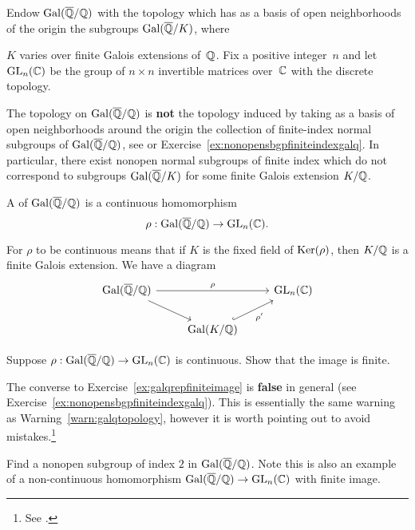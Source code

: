 Endow $\operatorname{Gal}(\overline{\mathbb{Q}}/\mathbb{Q})$ with the topology which has as a basis of open neighborhoods
of the origin the subgroups $\operatorname{Gal}(\overline{\mathbb{Q}}/K)$, where~{$K$ varies
over finite Galois extensions of~$\mathbb{Q}$.
Fix a positive integer~$n$ and let $\operatorname{GL}_n(\mathbb{C})$ be the group of
$n\times n$ invertible matrices over~$\mathbb{C}$ with the discrete topology.

\begin{warning}\label{warn:galqtopology}
	The topology on $\operatorname{Gal}(\overline{\mathbb{Q}}/\mathbb{Q})$ is {\bf not} the topology induced
	by taking as a basis of open neighborhoods around the origin
	the collection of finite-index normal subgroups of $\operatorname{Gal}(\overline{\mathbb{Q}}/\mathbb{Q})$,
	see \cite[Ch.~7]{milne:FT} or
	Exercise~\ref{ex:nonopensbgpfiniteindexgalq}. In particular,
	there exist nonopen normal subgroups of finite index which
	do not correspond to subgroups $\operatorname{Gal}(\overline{\mathbb{Q}}/K)$ for some
	finite Galois extension $K/\mathbb{Q}$.
\end{warning}

\begin{definition}
	A  of $\operatorname{Gal}(\overline{\mathbb{Q}}/\mathbb{Q})$
	is a continuous homomorphism
	$$
		\rho:\operatorname{Gal}(\overline{\mathbb{Q}}/\mathbb{Q})\to \operatorname{GL}_n(\mathbb{C}).
	$$
\end{definition}
For $\rho$ to be continuous means that if $K$ is the fixed
field of $\operatorname{Ker}(\rho)$, then $K/\mathbb{Q}$ is a finite Galois extension.  We have
a diagram
$$
	\begin{tikzcd}
		\galq \arrow{rr}{\rho} \arrow{dr} & & \GL_n(\C) \\
		& \Gal(K/\Q) \arrow[hook]{ur}[swap]{\rho'}
	\end{tikzcd}
$$

\begin{exercise}\label{ex:galqrepfiniteimage}
	Suppose $\rho:\operatorname{Gal}(\overline{\mathbb{Q}}/\mathbb{Q})\to\operatorname{GL}_n(\mathbb{C})$ is continuous.
	Show that the image is finite.
\end{exercise}

\begin{remark}
	The converse to Exercise~\ref{ex:galqrepfiniteimage}
	is \textbf{false} in general (see
	Exercise~\ref{ex:nonopensbgpfiniteindexgalq}).
	This is essentially the same warning as
	Warning~\ref{warn:galqtopology}, however it is worth
	pointing out to avoid mistakes.\footnote{
	See \cite[pg.~1]{artinconjectureLectureNotes}.}
\end{remark}

\begin{exercise}\label{ex:nonopensbgpfiniteindexgalq}
	Find a nonopen subgroup of index $2$ in $\operatorname{Gal}(\overline{\mathbb{Q}}/\mathbb{Q})$.
	Note this is also an example of a non-continuous
	homomorphism $\operatorname{Gal}(\overline{\mathbb{Q}}/\mathbb{Q})\to\operatorname{GL}_n(\mathbb{C})$ with finite image.
	

\end{exercise}}
